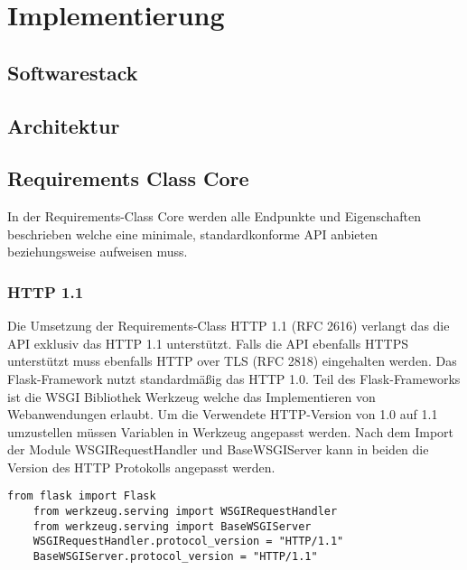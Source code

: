 \newpage
\restoregeometry
\section{Implementierung}
\subsection{Softwarestack}
\subsection{Architektur}
\subsection{Requirements Class Core}
In der Requirements-Class Core werden alle Endpunkte und Eigenschaften beschrieben welche eine minimale, standardkonforme API anbieten beziehungsweise aufweisen muss. 

\subsubsection{HTTP 1.1}
Die Umsetzung der Requirements-Class HTTP 1.1 (RFC 2616) verlangt das die API exklusiv das HTTP 1.1 unterstützt. 
Falls die API ebenfalls HTTPS unterstützt muss ebenfalls HTTP over TLS (RFC 2818) eingehalten werden. 
Das Flask-Framework nutzt standardmäßig das HTTP 1.0. Teil des Flask-Frameworks ist die WSGI Bibliothek Werkzeug welche
das Implementieren von Webanwendungen erlaubt. Um die Verwendete HTTP-Version von 1.0 auf 1.1 umzustellen müssen Variablen 
in Werkzeug angepasst werden. Nach dem Import der Module WSGIRequestHandler und BaseWSGIServer kann in beiden die 
Version des HTTP Protokolls angepasst werden. 

\begin{lstlisting}[caption={Konfiguration von Werkzeug auf HTTP 1.1}, style = Python]
    from flask import Flask
    from werkzeug.serving import WSGIRequestHandler
    from werkzeug.serving import BaseWSGIServer
    WSGIRequestHandler.protocol_version = "HTTP/1.1"
    BaseWSGIServer.protocol_version = "HTTP/1.1"
\end{lstlisting}\label{confWerkzeug}

